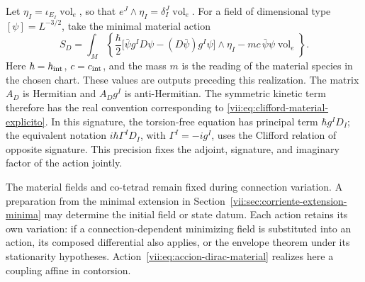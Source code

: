 Let \(\eta_I=\iota_{E_I}\operatorname{vol}_e\), so that
\(e^J\wedge\eta_I=\delta_I^J\operatorname{vol}_e\). For a
field of dimensional type \([\psi]=L^{-3/2}\), take the minimal
material action
\begin{equation}
 S_D=\int_M\left\{
 \frac{\hbar}{2}
 \bigl[\bar\psi g^I D\psi-(D\bar\psi)g^I\psi\bigr]\wedge\eta_I
 -mc\,\bar\psi\psi\operatorname{vol}_e\right\}.
 \label{vii:eq:accion-dirac-material}
\end{equation}
Here \(\hbar=\hbar_{\rm int}\), \(c=c_{\rm int}\), and the mass
\(m\) is the reading of the material species in the chosen chart.
These values are outputs preceding this realization. The matrix
\(A_D\) is Hermitian and \(A_Dg^I\) is anti-Hermitian. The
symmetric kinetic term therefore has the real convention corresponding to
\eqref{vii:eq:clifford-material-explicito}. In this signature, the
torsion-free equation has principal term \(\hbar g^I D_I\); the equivalent
notation \(i\hbar\Gamma^I D_I\), with \(\Gamma^I=-i g^I\),
uses the Clifford relation of opposite signature. This precision fixes
the adjoint, signature, and imaginary factor of the action jointly.

The material fields and co-tetrad remain fixed during connection
variation. A preparation from the minimal extension in
Section~\ref{vii:sec:corriente-extension-minima} may determine
the initial field or state datum. Each action retains its own
variation: if a connection-dependent minimizing field is substituted
into an action, its composed differential also applies,
or the envelope theorem under its stationarity hypotheses.
Action~\eqref{vii:eq:accion-dirac-material} realizes here a
coupling affine in contorsion.

